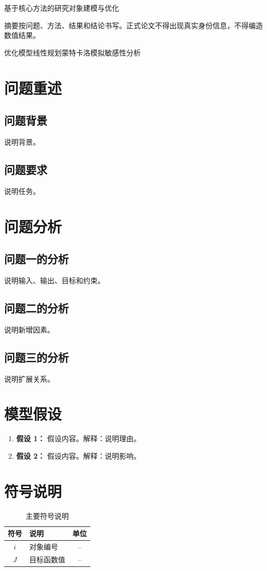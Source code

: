 \documentclass[UTF8,a4paper,zihao=-4]{ctexart}
\begin{document}
\setcounter{page}{1}
\begin{center}{\heiti{} 基于核心方法的研究对象建模与优化\par}\end{center}
摘要按问题、方法、结果和结论书写。正式论文不得出现真实身份信息，不得编造数值结果。
\par\vspace{1em}优化模型\quad 线性规划\quad 蒙特卡洛模拟\quad 敏感性分析
\newpage
\section{问题重述}\subsection{问题背景}说明背景。\subsection{问题要求}说明任务。
\section{问题分析}\subsection{问题一的分析}说明输入、输出、目标和约束。\subsection{问题二的分析}说明新增因素。\subsection{问题三的分析}说明扩展关系。
\section{模型假设}\begin{enumerate}\item \textbf{假设 1：} 假设内容。解释：说明理由。\item \textbf{假设 2：} 假设内容。解释：说明影响。\end{enumerate}
\section{符号说明}\begin{table}[H]\centering\caption{主要符号说明}\begin{tabularx}{\textwidth}{cXc}\toprule 符号&说明&单位\\\midrule $i$&对象编号&--\\$J$&目标函数值&--\\\bottomrule\end{tabularx}\end{table}
\end{document}
